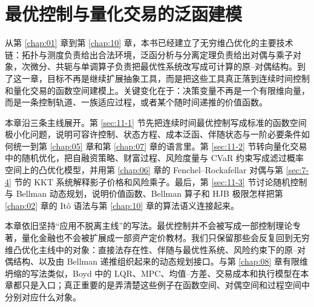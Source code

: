 \chapter{最优控制与量化交易的泛函建模}

\label{chap:11}

从第 \ref{chap:01} 章到第 \ref{chap:10} 章，本书已经建立了无穷维凸优化的主要技术链：拓扑与测度负责给出合法环境，泛函分析与分离定理负责给出对偶与乘子对象，次微分、共轭与单调算子负责把最优性系统改写成可计算的原--对偶结构。到了这一章，目标不再是继续扩展抽象工具，而是把这些工具真正落到连续时间控制和量化交易的函数空间建模上。关键变化在于：决策变量不再是一个有限维向量，而是一条控制轨道、一族适应过程，或者某个随时间递推的价值函数。

本章沿三条主线展开。第 \ref{sec:11-1} 节先把连续时间最优控制写成标准的函数空间极小化问题，说明可容许控制、状态方程、成本泛函、伴随状态与一阶必要条件如何统一到第 \ref{chap:05} 章和第 \ref{chap:07} 章的语言里。第 \ref{sec:11-2} 节转向量化交易中的随机优化，把自融资策略、财富过程、风险度量与 CVaR 约束写成滤过概率空间上的凸优化模型，并用第 \ref{chap:06} 章的 Fenchel--Rockafellar 对偶与第 \ref{sec:7-4} 节的 KKT 系统解释影子价格和风险乘子。最后，第 \ref{sec:11-3} 节讨论随机控制与 Bellman 动态规划，说明价值函数、Bellman 算子和 HJB 极限怎样把第 \ref{chap:02} 章的 It\^o 语法与第 \ref{chap:10} 章的算法语义连接起来。

本章依旧坚持“应用不脱离主线”的写法。最优控制并不会被写成一部控制理论专著，量化金融也不会被扩展成一部资产定价教材。我们只保留那些会反复回到无穷维凸优化主线中的对象：直接法存在性、伴随与最优性系统、风险约束下的原--对偶结构、以及由 Bellman 递推组织起来的动态规划接口。与第 \ref{chap:08} 章有限维坍缩的写法类似，Boyd 中的 LQR、MPC、均值--方差、交易成本和执行模型在本章都只是入口；真正重要的是弄清楚这些例子在函数空间、对偶空间和过程空间中分别对应什么对象。







